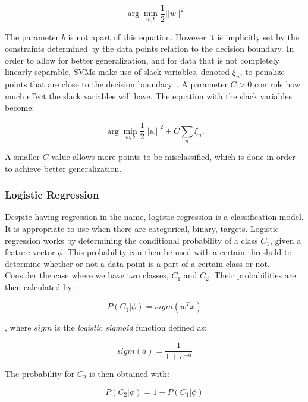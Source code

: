 \begin{equation}
    \arg\min_{w,b}\frac{1}{2}||w||^2
\end{equation}

The parameter $b$ is not apart of this equation. 
However it is implicitly set by the constraints determined by the data points relation to the decision boundary.
In order to allow for better generalization, and for data that is not completely linearly separable, SVMs make use of slack variables, denoted $\xi_n$, to penalize points that are close to the decision boundary~\cite{bishop2006pattern}.
A parameter $C>0$ controls how much effect the slack variables will have.
The equation with the slack variables become:

\begin{equation}
    \arg\min_{w,b}\frac{1}{2}||w||^2 + C \sum_n\xi_n.
\end{equation}

A smaller $C$-value allows more points to be misclassified, which is done in order to achieve better generalization.

\subsubsection{Logistic Regression}

Despite having regression in the name, logistic regression is a classification model.
It is appropriate to use when there are categorical, binary, targets.
Logistic regression works by determining the conditional probability of a class $C_1$, given a feature vector $\phi$.
This probability can then be used with a certain threshold to determine whether or not a data point is a part of a certain class or not.
Consider the case where we have two classes, $C_1$ and $C_2$.
Their probabilities are then calculated by~\cite{bishop2006pattern}:

\begin{equation}\label{eq:logistic-regression}
    P(C_1|\phi) = sigm(w^Tx)
\end{equation}

, where $sigm$ is the \textit{logistic sigmoid} function defined as:

\begin{equation}
    sigm(a) = \frac{1}{1+e^{-a}}
\end{equation}

The probability for $C_2$ is then obtained with:

\begin{equation}
    P(C_2|\phi) = 1 - P(C_1|\phi)
\end{equation}

